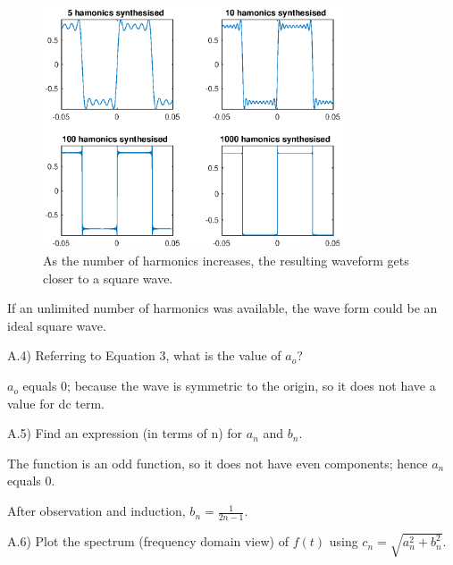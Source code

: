 

\begin{figure}[hb]
  \centering
  \includegraphics[width=0.79\textwidth]{matlab/fig/A_q_2.eps}
  \caption{As the number of harmonics increases, the resulting waveform gets closer to a square wave.}    
  \label{fig:A_q_2}
\end{figure}

If an unlimited number of harmonics was available, the wave form could be an ideal square wave.

\pagebreak

\begin{tcolorbox}
  A.4) Referring to Equation 3, what is the value of $a_o$?
\end{tcolorbox}

$a_o$ equals 0; because the wave is symmetric to the origin, so it does not have a value for dc term.

\begin{tcolorbox}
  A.5) Find an expression (in terms of n) for $a_n$ and $b_n$.
\end{tcolorbox}

The function is an odd function, so it does not have even components; hence $a_n$ equals 0.

After observation and induction, $b_n = \frac{1}{2n-1}$.

\begin{tcolorbox}
  A.6) Plot the spectrum (frequency domain view) of $f(t)$ using $c_n=\sqrt{a_n^2+b_n^2}$.
\end{tcolorbox}



